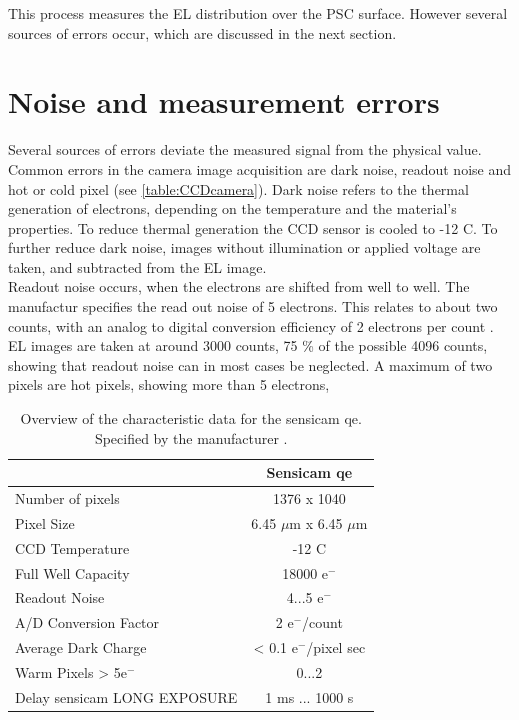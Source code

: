 This process measures the EL distribution over the PSC surface. However several sources of errors occur, which are discussed in the next section.
\FloatBarrier
\section{Noise and measurement errors}
Several sources of errors deviate the measured signal from the physical value. Common errors in the camera image acquisition are dark noise, readout noise and hot or cold pixel (see \autoref{table:CCDcamera}). Dark noise refers to the thermal generation of electrons, depending on the temperature and the material's properties. To reduce thermal generation the CCD sensor is cooled to -12 \textdegree C. To further reduce dark noise, images without illumination or applied voltage are taken, and subtracted from the EL image.\\

Readout noise occurs, when the electrons are shifted from well to well. The manufactur specifies the read out noise of 5 electrons. This relates to about two counts, with an analog to digital conversion efficiency of 2 electrons per count \cite{ManualSensicam}. EL images are taken at around 3000 counts, 75 \% of the possible 4096 counts, showing that readout noise can in most cases be neglected. A maximum of two pixels are hot pixels, showing more than 5 electrons,  \\

\begin{table}[h]
	\centering
	\caption{Overview of the characteristic data for the sensicam qe. Specified by the manufacturer \cite{ManualSensicam}.}
	\label{table:CCDcamera}
	\begin{tabular}{l c}
		\hline
		& \textbf{Sensicam qe} \\ \hline
		Number of pixels & 1376 x 1040 \\
		Pixel Size & 6.45 $\mu$m x 6.45 $\mu$m \\
		CCD Temperature & -12 \textdegree C \\
		Full Well Capacity & 18000 e$^-$ \\
		Readout Noise & 4...5 e$^-$ \\
		A/D Conversion Factor & 2 e$^-$/count \\
		Average Dark Charge & < 0.1 e$^-$/pixel sec \\
		Warm Pixels > 5e$^-$ & 0...2 \\
		Delay sensicam LONG EXPOSURE & 1 ms ... 1000 s \\ \hline
	\end{tabular}
\end{table}